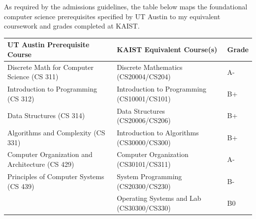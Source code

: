 
\begin{paragraph}
  \small As required by the admissions guidelines, the table below maps the foundational computer science prerequisites specified by UT Austin to my equivalent coursework and grades completed at KAIST.
\end{paragraph}

\vspace{0.2cm}

\begin{center}
\small
\begin{tabular}{|p{7.5cm}|p{7.5cm}|l|}
  \hline
  \textbf{UT Austin Prerequisite Course} & \textbf{KAIST Equivalent Course(s)} & \textbf{Grade} \\
  \hline\hline
  Discrete Math for Computer Science (CS 311) & Discrete Mathematics (CS20004/CS204) & A- \\
  \hline
  Introduction to Programming (CS 312) & Introduction to Programming (CS10001/CS101) & B+ \\
  \hline
  Data Structures (CS 314) & Data Structures (CS20006/CS206) & B+ \\
  \hline
  Algorithms and Complexity (CS 331) & Introduction to Algorithms (CS30000/CS300) & B+ \\
  \hline
  Computer Organization and Architecture (CS 429) & Computer Organization (CS30101/CS311) & A- \\
  \hline
  Principles of Computer Systems (CS 439) & System Programming (CS20300/CS230) & B- \\
                                          & Operating Systems and Lab (CS30300/CS330) & B0 \\
  \hline
\end{tabular}
\end{center}